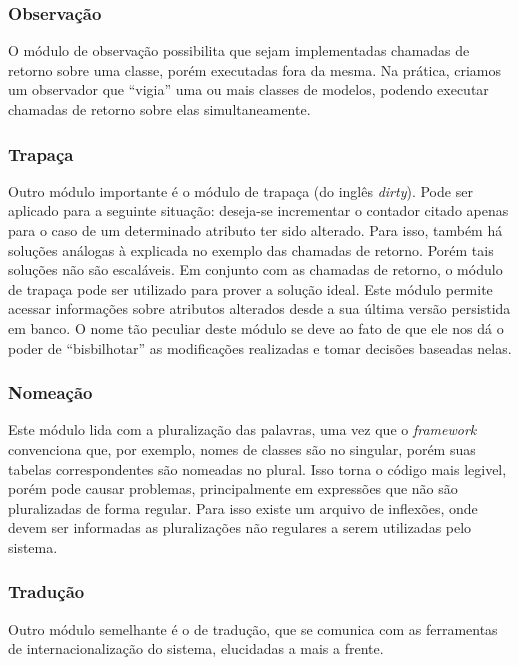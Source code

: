 \subsubsection{Observação}

O módulo de observação possibilita que sejam implementadas chamadas de retorno sobre uma classe, porém executadas fora da mesma. Na prática, criamos um observador que ``vigia'' uma ou mais classes de modelos, podendo executar chamadas de retorno sobre elas simultaneamente.

\subsubsection{Trapaça}

Outro módulo importante é o módulo de trapaça (do inglês \textit{dirty}). Pode ser aplicado para a seguinte situação: deseja-se incrementar o contador citado apenas para o caso de um determinado atributo ter sido alterado. Para isso, também há soluções análogas à explicada no exemplo das chamadas de retorno. Porém tais soluções não são escaláveis. Em conjunto com as chamadas de retorno, o módulo de trapaça pode ser utilizado para prover a solução ideal. Este módulo permite acessar informações sobre atributos alterados desde a sua última versão persistida em banco. O nome tão peculiar deste módulo se deve ao fato de que ele nos dá o poder de ``bisbilhotar'' as modificações realizadas e tomar decisões baseadas nelas.

\subsubsection{Nomeação}

Este módulo lida com a pluralização das palavras, uma vez que o \textit{framework} convenciona que, por exemplo, nomes de classes são no singular, porém suas tabelas correspondentes são nomeadas no plural. Isso torna o código mais legivel, porém pode causar problemas, principalmente em expressões que não são pluralizadas de forma regular. Para isso existe um arquivo de inflexões, onde devem ser informadas as pluralizações não regulares a serem utilizadas pelo sistema.

\subsubsection{Tradução}

Outro módulo semelhante é o de tradução, que se comunica com as ferramentas de internacionalização do sistema, elucidadas a mais a frente.

